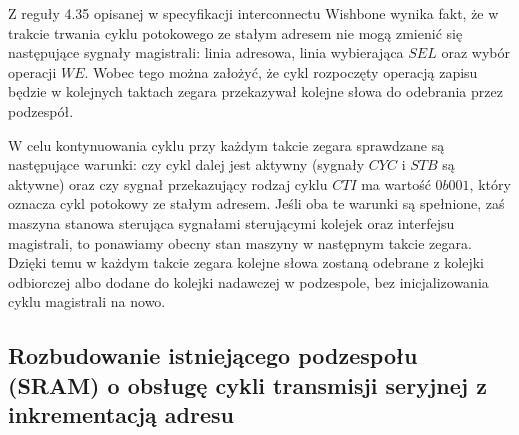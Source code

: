 Z reguły 4.35 opisanej w specyfikacji interconnectu Wishbone wynika fakt, że w trakcie trwania cyklu potokowego ze stałym adresem nie mogą zmienić się następujące sygnały magistrali: linia adresowa, linia wybierająca $SEL$ oraz wybór operacji $WE$. Wobec tego można założyć, że cykl rozpoczęty operacją zapisu będzie w kolejnych taktach zegara przekazywał kolejne słowa do odebrania przez podzespół.


W celu kontynuowania cyklu przy każdym takcie zegara sprawdzane są następujące warunki: czy cykl dalej jest aktywny (sygnały $CYC$ i $STB$ są aktywne) oraz czy sygnał przekazujący rodzaj cyklu $CTI$ ma wartość $0b001$, który oznacza cykl potokowy ze stałym adresem. Jeśli oba te warunki są spełnione, zaś maszyna stanowa sterująca sygnałami sterującymi kolejek oraz interfejsu magistrali, to ponawiamy obecny stan maszyny w następnym takcie zegara. Dzięki temu w każdym takcie zegara kolejne słowa zostaną odebrane z kolejki odbiorczej albo dodane do kolejki nadawczej w podzespole, bez inicjalizowania cyklu magistrali na nowo.


\subsection{Rozbudowanie istniejącego podzespołu (SRAM) o obsługę cykli transmisji seryjnej z inkrementacją adresu}
